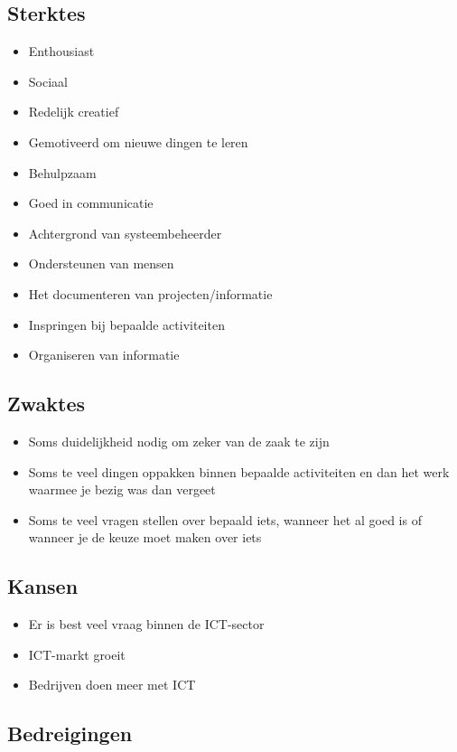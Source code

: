 \subsection{Sterktes}

\begin{itemize}
\item
  Enthousiast
\item
  Sociaal
\item
  Redelijk creatief
\item
  Gemotiveerd om nieuwe dingen te leren
\item
  Behulpzaam
\item
  Goed in communicatie
\item
  Achtergrond van systeembeheerder
\item
  Ondersteunen van mensen
\item
  Het documenteren van projecten/informatie
\item
  Inspringen bij bepaalde activiteiten
\item
  Organiseren van informatie
\end{itemize}

\subsection{Zwaktes}

\begin{itemize}
\item
  Soms duidelijkheid nodig om zeker van de zaak te zijn
\item
  Soms te veel dingen oppakken
  binnen bepaalde activiteiten
  en dan het werk waarmee je bezig was dan vergeet
\item
  Soms te veel vragen stellen over bepaald iets,
  wanneer het al goed is of
  wanneer je de keuze moet maken over iets
\end{itemize}
  
\subsection{Kansen}

\begin{itemize}
\item
  Er is best veel vraag binnen de ICT-sector
\item
  ICT-markt groeit
\item
  Bedrijven doen meer met ICT
\end{itemize}

\subsection{Bedreigingen}

